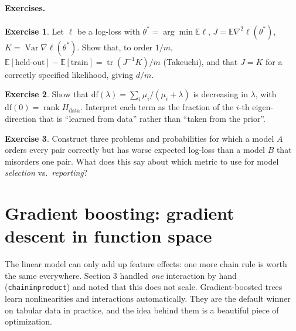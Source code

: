 \documentclass[11pt]{article}
\theoremstyle{definition}
\newtheorem{exercise}{Exercise}[section]
\theoremstyle{plain}
\theoremstyle{remark}
\newcommand{\E}{\mathbb{E}}
\newcommand{\code}[1]{\texttt{#1}}
\renewcommand{\_}{\oldunderscore\allowbreak}
\DeclareMathOperator{\Var}{Var}
\begin{document}
\paragraph{Exercises.}
\begin{exercise}\label{ex:aic}
Let $\ell$ be a log-loss with $\theta^\ast=\arg\min\E\ell$, $J=\E\nabla^2\ell(\theta^\ast)$, $K=\Var\nabla\ell(\theta^\ast)$. Show that, to order $1/m$,
$\E[\text{held-out}]-\E[\text{train}]=\operatorname{tr}(J^{-1}K)/m$ (Takeuchi), and that $J=K$ for a correctly specified likelihood, giving $d/m$.
\end{exercise}
\begin{exercise}
Show that $\mathrm{df}(\lambda)=\sum_i\mu_i/(\mu_i+\lambda)$ is decreasing in $\lambda$, with $\mathrm{df}(0)=\operatorname{rank}H_{\text{data}}$. Interpret each term as the
fraction of the $i$-th eigen-direction that is ``learned from data'' rather than ``taken from the prior''.
\end{exercise}
\begin{exercise}
Construct three problems and probabilities for which a model $A$ orders every pair correctly but has worse expected log-loss than a
model $B$ that misorders one pair. What does this say about which metric to use for model \emph{selection} vs.\ \emph{reporting}?
\end{exercise}

\section{Gradient boosting: gradient descent in function space}
\label{sec:boosting}

The linear model can only add up feature effects: one more chain rule is worth the same everywhere. Section 3 handled
\emph{one} interaction by hand (\code{chain\_in\_product}) and noted that this does not scale. Gradient-boosted trees learn
nonlinearities and interactions automatically. They are the default winner on tabular data in practice, and the idea behind them is
a beautiful piece of optimization.
\end{document}
